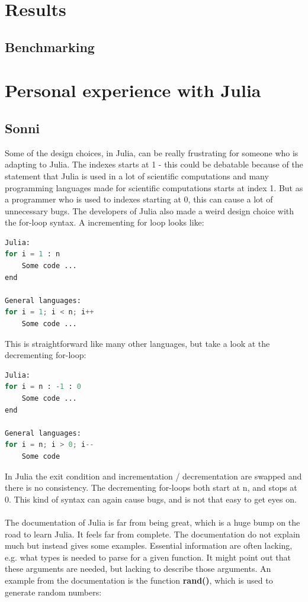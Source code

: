\documentclass[a4paper, 11pt, titlepage]{article}
\begin{document}
\section{Results}
\subsection{Benchmarking}

\section{Personal experience with Julia}
\subsection{Sonni}
Some of the design choices, in Julia, can be really frustrating for someone who is adapting to Julia. The indexes starts at 1 - this could be debatable because of the statement that Julia is used in a lot of scientific computations and many programming languages made for scientific computations starts at index 1. But as a programmer who is used to indexes starting at 0, this can cause a lot of unnecessary bugs. The developers of Julia also made a weird design choice with the for-loop syntax. A incrementing for loop looks like:
\begin{lstlisting}[language=python]
Julia:
for i = 1 : n
	Some code ...
end

General languages:
for i = 1; i < n; i++
	Some code ...
\end{lstlisting}
This is straightforward like many other languages, but take a look at the decrementing for-loop:
\begin{lstlisting}[language=python]
Julia:
for i = n : -1 : 0
	Some code ...
end

General languages:
for i = n; i > 0; i--
	Some code
\end{lstlisting}
In Julia the exit condition and incrementation / decrementation are swapped and there is no consistency. The decrementing for-loops both start at n, and stops at 0. This kind of syntax can again cause bugs, and is not that easy to get eyes on.\\
\\
The documentation of Julia is far from being great, which is a huge bump on the road to learn Julia. It feels far from complete. The documentation do not explain much but instead gives some examples. Essential information are often lacking, e.g. what types is needed to parse for a given function. It might point out that these arguments are needed, but lacking to describe those arguments. An example from the documentation is the function \textbf{rand()}, which is used to generate random numbers:
\end{document}
